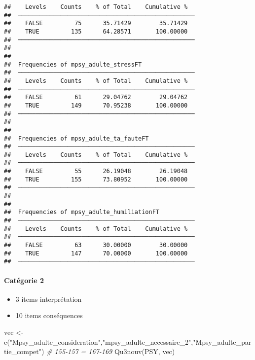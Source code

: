 \documentclass[
]{article}
\newenvironment{Shaded}{\begin{snugshade}}{\end{snugshade}}
\newcommand{\CommentTok}[1]{\textcolor[rgb]{0.56,0.35,0.01}{\textit{#1}}}
\newcommand{\FunctionTok}[1]{\textcolor[rgb]{0.00,0.00,0.00}{#1}}
\newcommand{\NormalTok}[1]{#1}
\newcommand{\OtherTok}[1]{\textcolor[rgb]{0.56,0.35,0.01}{#1}}
\newcommand{\StringTok}[1]{\textcolor[rgb]{0.31,0.60,0.02}{#1}}
\providecommand{\tightlist}{%
  \setlength{\itemsep}{0pt}\setlength{\parskip}{0pt}}
\begin{document}
\begin{verbatim}
##    Levels    Counts    % of Total    Cumulative %   
##  ────────────────────────────────────────────────── 
##    FALSE         75      35.71429        35.71429   
##    TRUE         135      64.28571       100.00000   
##  ────────────────────────────────────────────────── 
## 
## 
##  Frequencies of mpsy_adulte_stressFT                
##  ────────────────────────────────────────────────── 
##    Levels    Counts    % of Total    Cumulative %   
##  ────────────────────────────────────────────────── 
##    FALSE         61      29.04762        29.04762   
##    TRUE         149      70.95238       100.00000   
##  ────────────────────────────────────────────────── 
## 
## 
##  Frequencies of mpsy_adulte_ta_fauteFT              
##  ────────────────────────────────────────────────── 
##    Levels    Counts    % of Total    Cumulative %   
##  ────────────────────────────────────────────────── 
##    FALSE         55      26.19048        26.19048   
##    TRUE         155      73.80952       100.00000   
##  ────────────────────────────────────────────────── 
## 
## 
##  Frequencies of mpsy_adulte_humiliationFT           
##  ────────────────────────────────────────────────── 
##    Levels    Counts    % of Total    Cumulative %   
##  ────────────────────────────────────────────────── 
##    FALSE         63      30.00000        30.00000   
##    TRUE         147      70.00000       100.00000   
##  ──────────────────────────────────────────────────
\end{verbatim}

\hypertarget{catuxe9gorie-2-1}{%
\paragraph{Catégorie 2}\label{catuxe9gorie-2-1}}

\begin{itemize}
\tightlist
\item
  3 items interprétation
\item
  10 items conséquences
\end{itemize}

\begin{Shaded}
\begin{Highlighting}[]
\NormalTok{vec }\OtherTok{\textless{}{-}} \FunctionTok{c}\NormalTok{(}\StringTok{"Mpsy\_adulte\_consideration"}\NormalTok{,}\StringTok{"mpsy\_adulte\_necessaire\_2"}\NormalTok{,}\StringTok{"Mpsy\_adulte\_partie\_compet"}\NormalTok{) }\CommentTok{\# 155{-}157 = 167{-}169}
\FunctionTok{Qu3nouv}\NormalTok{(PSY, vec)}
\end{Highlighting}
\end{Shaded}
\end{document}
